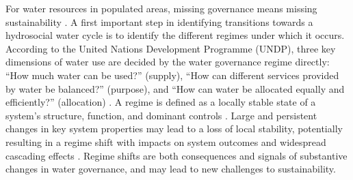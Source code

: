 \documentclass[9pt, twocolumn, twoside, lineno]{pnas-new}
\begin{document}
\label{introduction-section-2}
For water resources in populated areas, missing governance means missing sustainability \cite{undpwatergovernancefacility2015}.
A first important step in identifying transitions towards a hydrosocial water cycle is to identify the different regimes under which it occurs.
According to the United Nations Development Programme (UNDP), three key dimensions of water use are decided by the water governance regime directly: ``How much water can be used?'' (supply), ``How can different services provided by water be balanced?'' (purpose), and ``How can water be allocated equally and efficiently?'' (allocation)
\cite{undpwatergovernancefacility2013,undpwatergovernancefacility2015,undpwatergovernancefacility2016}.
A regime is defined as a locally stable state of a system’s structure, function, and dominant controls \cite{carpenterEarlyWarningsRegime2011}. 
Large and persistent changes in key system properties may lead to a loss of local stability, potentially resulting in a regime shift with impacts on system outcomes and widespread cascading effects
\cite{rocha2018,gregr2020}.
Regime shifts are both consequences and signals of substantive changes in water governance, and may lead to new challenges to sustainability.
\end{document}

